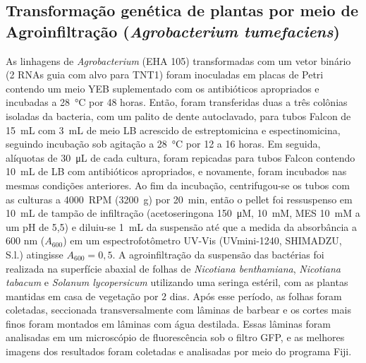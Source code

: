 \subsection{Transformação genética de plantas por meio de Agroinfiltração (\textit{Agrobacterium tumefaciens})}
As linhagens de \textit{Agrobacterium} (EHA 105) transformadas com um vetor
binário (2 RNAs guia com alvo para TNT1) foram inoculadas em placas de Petri
contendo um meio YEB suplementado com os antibióticos apropriados e incubadas a
\qty{28}{\celsius} por 48 horas. Então, foram transferidas duas a três colônias
isoladas da bacteria, com um palito de dente autoclavado, para tubos Falcon de
\qty{15}{mL} com \qty{3}{mL} de meio LB acrescido de estreptomicina e
espectinomicina, seguindo incubação sob agitação a \qty{28}{\celsius} por 12 a
16 horas. Em seguida, alíquotas de \qty{30}{\micro L} de cada cultura, foram
repicadas para tubos Falcon contendo \qty{10}{mL} de LB com antibióticos
apropriados, e novamente, foram incubados nas mesmas condições anteriores. Ao fim
da incubação, centrifugou-se os tubos com as culturas a \qty{4000}{RPM}
(\qty{3200}{g}) por \qty{20}{min}, então o pellet foi ressuspenso em
\qty{10}{mL} de tampão de infiltração (acetoseringona \qty{150}{\micro M},
 \qty{10}{mM}, MES \qty{10}{mM} a um pH de 5,5) e diluiu-se \qty{1}{mL}
da suspensão até que a medida da absorbância a 600 nm ($A_{600}$) em um
espectrofotômetro UV-Vis (UVmini-1240, SHIMADZU, S.l.)  atingisse
$A_{600} = 0,5$.
A agroinfiltração da suspensão das bactérias foi realizada na superfície abaxial
de folhas de \textit{Nicotiana benthamiana}, \textit{Nicotiana tabacum} e
\textit{Solanum lycopersicum} utilizando uma seringa estéril, com as plantas
mantidas em casa de vegetação por 2 dias. Após esse período, as folhas foram
coletadas, seccionada transversalmente com lâminas de barbear e os cortes mais
finos foram montados em lâminas com água destilada. Essas lâminas foram
analisadas em um microscópio de fluorescência sob o filtro GFP, e as melhores
imagens dos resultados foram coletadas e analisadas por meio do programa Fiji.  
